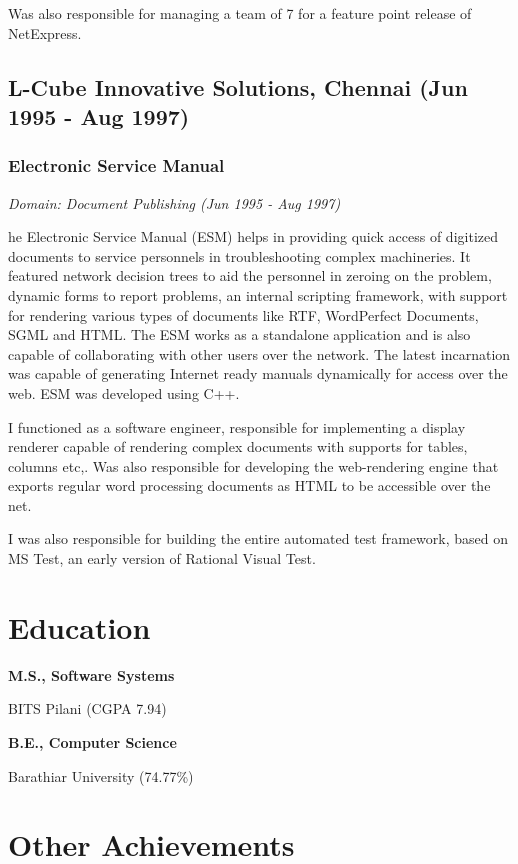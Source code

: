 \documentclass[a4paper,12pt]{article}
\newcommand\cveducation[4]{

  \normalfont\bf{#1, #2}

  \normalfont\small{#3 (#4)}
}
\newcommand\cvsubsection[3]{\subsection*{#1 \quad \small{(#2 - #3)}}}
\newcommand\cvprojectentry[5]{
  \subsubsection*{#1}
  
  \vspace{-7pt}
  
  \it{Domain: #2}\normalfont{} \quad (#3 - #4)
  
}
\begin{document}
Was also responsible for managing a team of 7 for a feature point
release of NetExpress.

\cvsubsection{L-Cube Innovative Solutions, Chennai}{Jun 1995}{Aug 1997}

\cvprojectentry{Electronic Service Manual}{Document Publishing}{Jun 1995}{Aug 1997}
 
The Electronic Service Manual (ESM) helps in providing quick access of
digitized documents to service personnels in troubleshooting complex
machineries. It featured network decision trees to aid the personnel
in zeroing on the problem, dynamic forms to report problems, an
internal scripting framework, with support for rendering various types
of documents like RTF, WordPerfect Documents, SGML and HTML. The ESM
works as a standalone application and is also capable of collaborating
with other users over the network. The latest incarnation was capable
of generating Internet ready manuals dynamically for access over the
web. ESM was developed using C++.
 
I functioned as a software engineer, responsible for implementing a
display renderer capable of rendering complex documents with supports
for tables, columns etc,. Was also responsible for developing the
web-rendering engine that exports regular word processing documents as
HTML to be accessible over the net.
 
I was also responsible for building the entire automated test
framework, based on MS Test, an early version of Rational Visual Test.


\section*{Education}

\cveducation{M.S.}{Software Systems}{BITS Pilani}{CGPA 7.94}
\cveducation{B.E.}{Computer Science}{Barathiar University}{74.77\%}

\section*{Other Achievements}
\end{document}
